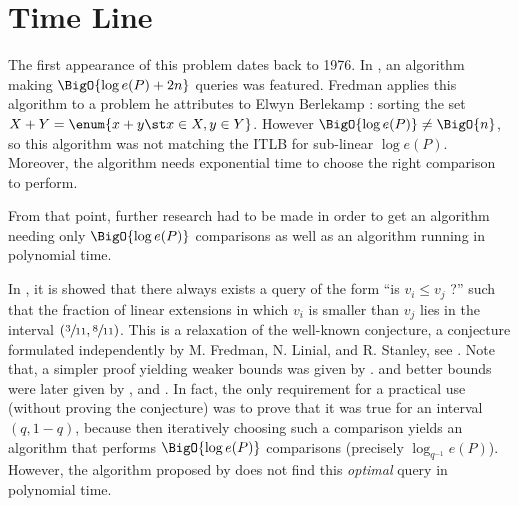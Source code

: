 \section{Time Line}

The first appearance of this problem dates back to 1976. In
\cite{fredman:1976}, an algorithm making $\BigO{\log e(P) + 2n}$ queries was
featured. Fredman applies this algorithm to a problem he attributes to Elwyn
Berlekamp : sorting the set $X + Y = \enum{x + y \st x \in X, y \in Y}$. However
$\BigO{\log e(P)} \neq \BigO{n}$, so this algorithm was not matching the ITLB
for sub-linear $\log e(P)$. Moreover, the algorithm needs exponential time to
choose the right comparison to perform.

From that point, further research had to be made in order to get an algorithm
needing only $\BigO{\log e(P)}$ comparisons as well as an algorithm running in
polynomial time.

In \cite{kahn1984balancing}, it is showed that there always exists a query of
the form ``is $v_i \leq v_j$ ?'' such that the fraction of linear extensions in
which $v_i$ is smaller than $v_j$ lies in the interval $(\sfrac{3}{11},
\sfrac{8}{11})$. This is a relaxation of the well-known
\onethirdtwothird conjecture, a conjecture formulated
independently by M. Fredman, N. Linial, and R. Stanley, see
\cite{linial1984information}. Note that, a simpler proof yielding weaker bounds
was given by \cite{kahn1991balancing}. and better bounds were later given by
\cite{brightwell1995balancing}, and \cite{brightwell1999balanced}. In fact, the
only requirement for a practical use (without proving the conjecture) was to
prove that it was true for an interval $(q, 1-q)$, because then iteratively
choosing such a comparison yields an algorithm that performs $\BigO{\log e(P)}$
comparisons (precisely $\log_{q^{-1}} e(P)$). However, the algorithm proposed
by \cite{kahn1984balancing} does not find this \emph{optimal} query in
polynomial time.
